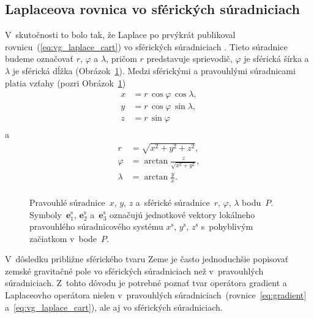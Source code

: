 \documentclass[a4paper,12pt]{book}
\let\vec\mathbf
\begin{document}
\subsection{Laplaceova rovnica vo sférických súradniciach}
\label{sec:laplace_equation_sph}

V~skutočnosti to bolo tak, že Laplace po prvýkrát publikoval 
rovnicu~(\ref{eq:vg_laplace_cart}) vo sférických súradniciach 
\parencite{MacMillan1930}.  Tieto súradnice budeme označovať $r$, $\varphi$ 
a $\lambda$, pričom $r$ predstavuje sprievodič, $\varphi$ je sférická šírka 
a~$\lambda$ je sférická dĺžka (Obrázok~\ref{fig:cart_sph}).  Medzi sférickými 
a pravouhlými súradnicami platia vzťahy (pozri Obrázok~\ref{fig:cart_sph})
%
\begin{equation}
\label{eq:sph2cart}
\begin{split}
x &= r \, \cos\varphi \, \cos\lambda{,}\\
y &= r \, \cos\varphi \, \sin\lambda{,}\\
z &= r \, \sin\varphi\\
\end{split}
\end{equation}
%
a
%
\begin{equation}
\label{eq:cart2sph}
\begin{split}
r &= \sqrt{x^2 + y^2 + z^2}{,}\\
\varphi &= \arctan \frac{z}{\sqrt{x^2 + y^2}}{,}\\
\lambda &= \arctan \frac{y}{x}{.}\\
\end{split}
\end{equation}

\begin{figure}
\centering

\caption{Pravouhlé súradnice~$x$, $y$, $z$ a~sférické súradnice~$r$, $\varphi$, 
$\lambda$ bodu~$P$.  Symboly~$\vec{e}_1^\mathrm{s}$, $\vec{e}_2^\mathrm{s}$ 
a~$\vec{e}_3^\mathrm{s}$ označujú jednotkové vektory lokálneho pravouhlého 
súradnicového systému $x^\mathrm{s}$, $y^\mathrm{s}$, $z^\mathrm{s}$ 
s~pohyblivým začiatkom v~bode~$P$.}
\label{fig:cart_sph}
\end{figure}

V~dôsledku približne sférického tvaru Zeme je často jednoduchšie popisovať 
zemské gravitačné pole vo sférických súradniciach než v~pravouhlých 
súradniciach.  Z~tohto dôvodu je potrebné poznať tvar operátora gradient 
a Laplaceovho operátora nielen v~pravouhlých 
súradniciach~(rovnice~\ref{eq:gradient} a~\ref{eq:vg_laplace_cart}), ale aj vo 
sférických súradniciach.
\end{document}
